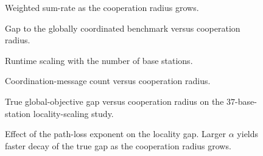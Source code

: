 \begin{figure}[t]
  \centering
  \caption{Weighted sum-rate as the cooperation radius grows.}
  \label{fig:sumrate}
\end{figure}

\begin{figure}[t]
  \centering
  \caption{Gap to the globally coordinated benchmark versus cooperation radius.}
  \label{fig:gap}
\end{figure}

\begin{figure}[t]
  \centering
  \caption{Runtime scaling with the number of base stations.}
  \label{fig:runtime}
\end{figure}

\begin{figure}[t]
  \centering
  \caption{Coordination-message count versus cooperation radius.}
  \label{fig:signaling}
\end{figure}

\begin{figure}[t]
  \centering
  \caption{True global-objective gap versus cooperation radius on the $37$-base-station locality-scaling study.}
  \label{fig:locality_scaling}
\end{figure}

\begin{figure}[t]
  \centering
  \caption{Effect of the path-loss exponent on the locality gap. Larger $\alpha$ yields faster decay of the true gap as the cooperation radius grows.}
  \label{fig:alpha_scaling}
\end{figure}
